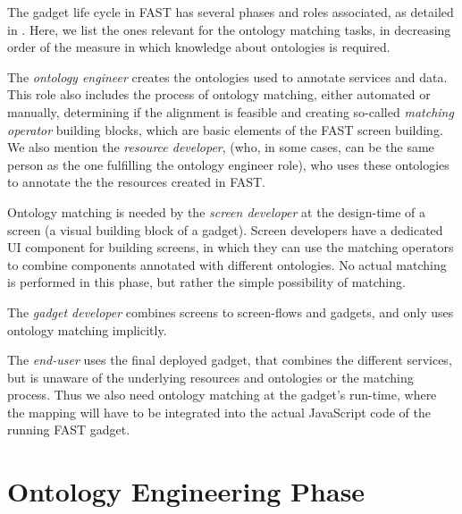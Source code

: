 The gadget life cycle in FAST has several phases and roles associated, as detailed in \cite{hoyer-fast}. Here, we list the ones relevant for the ontology matching tasks, in decreasing order of the measure in which knowledge about ontologies is required.
\begin{inparaenum}[(i)]
    \item The \textit{ontology engineer} creates the ontologies used to annotate services and data. This role also includes the process of ontology matching, either automated or manually, determining if the alignment is feasible and creating so-called \emph{matching operator} building blocks, which are basic elements of the FAST screen building. We also mention the \textit{resource developer}, (who, in some cases, can be the same person as the one fulfilling the ontology engineer role), who uses these ontologies to annotate the the resources created in FAST.
    \item Ontology matching is needed by the \textit{screen developer} at the design-time of a screen (a visual building block of a gadget). Screen developers have a dedicated UI component for building screens, in which they can use the matching operators to combine components annotated with different ontologies. No actual matching is performed in this phase, but rather the simple possibility of matching.
    \item The \emph{gadget developer} combines screens to screen-flows and gadgets, and only uses ontology matching implicitly.
    \item The \textit{end-user} uses the final deployed gadget, that combines the different services, but is unaware of the underlying resources and ontologies or the matching process. Thus we also need ontology matching at the gadget's run-time, where the mapping will have to be integrated into the actual JavaScript code of the running FAST gadget. %
\end{inparaenum}

\section{Ontology Engineering Phase}


